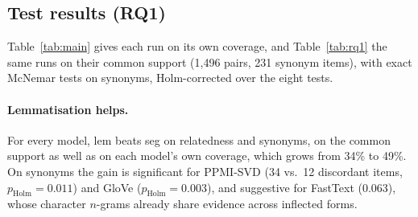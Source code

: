 \documentclass[11pt]{article}
\newcommand{\vk}[1]{\textsf{#1}}
\begin{document}
\begin{table}[t]\centering\small

\caption{Decision log. Dev data, options compared on their common support
($\rho$ / synonym accuracy). Lexicon and profile rows: $d=300$ without
respelling; settings, technique, word2vec, smoothing and minimum-count rows:
$d=300$; others: the main setting.}
\label{tab:decisions}
\end{table}

\subsection{Test results (RQ1)}
Table~\ref{tab:main} gives each run on its own coverage, and
Table~\ref{tab:rq1} the same runs on their common support (1,496 pairs, 231
synonym items), with exact McNemar tests on synonyms, Holm-corrected over
the eight tests.

\begin{table}[t]\centering\small
\setlength{\tabcolsep}{4.5pt}

\caption{Test results (cleaned benchmark), each run on its own coverage
(\%). Relatedness: Spearman $\rho$, AUC same-synset vs.\ unrelated
(AUC$_{20}$) and same-varga vs.\ unrelated (AUC$_{10}$), 3-way macro-F1 with
dev-tuned thresholds. Synonyms: accuracy (chance 25\%). Cat.: EvalSan
semantic categorisation; Varga: $k$-means ($k=22$) against the Amarakośa
vargas (permutation null 0.018). word2vec and FastText are mean-centred
(chosen on dev).}
\label{tab:main}
\end{table}

\begin{table}[t]\centering\footnotesize
\setlength{\tabcolsep}{2.2pt}

\caption{Common support: $\rho$, synonym accuracy (\%), and Holm-adjusted
McNemar $p$ for \vk{seg}$\to$\vk{lem} and \vk{lem}$\to$\vk{lid}.}
\label{tab:rq1}
\end{table}

\paragraph{Lemmatisation helps.} For every model, \vk{lem} beats \vk{seg} on
relatedness and synonyms, on the common support as well as on each model's
own coverage, which grows from 34\% to 49\%. On synonyms the gain is
significant for PPMI-SVD (34 vs.\ 12 discordant items, $p_{\mathrm{Holm}}=0.011$)
and GloVe ($p_{\mathrm{Holm}}=0.003$), and suggestive for FastText (0.063),
whose character $n$-grams already share evidence across inflected forms.
\end{document}
